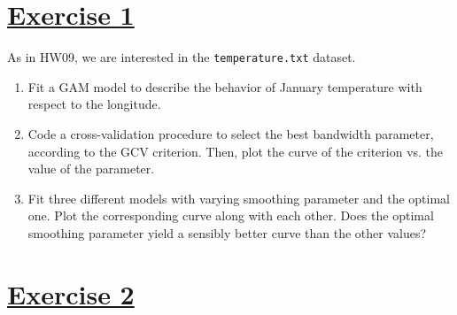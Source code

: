 \documentclass[a4paper,12pt]{article}\usepackage[]{graphicx}\usepackage[]{color}
\begin{document}

\begin{center}
\bigskip

\bigskip

\bigskip

\bigskip

\bigskip

\bigskip


\bigskip

\bigskip

\bigskip
\end{center}



\section*{\underline{Exercise 1}}
As in HW09, we are interested in the \verb"temperature.txt" dataset.

\begin{enumerate}
\item{Fit a GAM model to describe the behavior of January temperature with respect to the longitude.}
\item{Code a cross-validation procedure to select the best bandwidth parameter, according to the GCV criterion. Then, plot the curve of the criterion vs. the value of the parameter.}
\item{Fit three different models with varying smoothing parameter and the optimal one. Plot the corresponding curve along with each other. Does the optimal smoothing parameter yield a sensibly better curve than the other values?}
\end{enumerate}

\section*{\underline{Exercise 2}}
\end{document}
